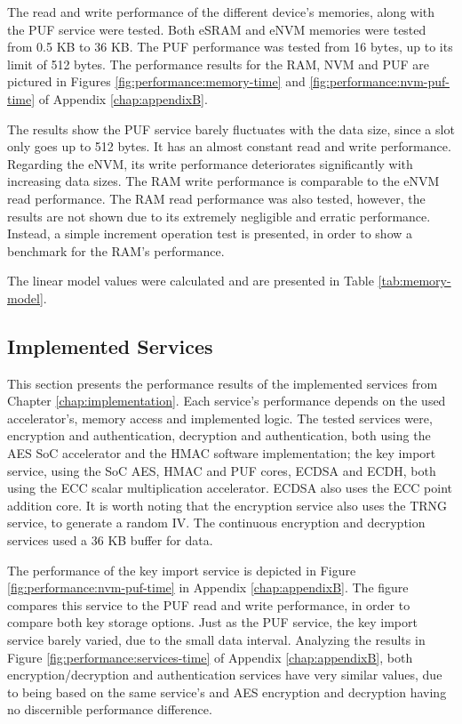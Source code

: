 The read and write performance of the different device's memories, along with the PUF service were tested. Both eSRAM and eNVM memories were tested from 0.5 KB to 36 KB. The PUF performance was tested from 16 bytes, up to its limit of 512 bytes.
The performance results for the RAM, NVM and PUF are pictured in Figures \ref{fig:performance:memory-time} and \ref{fig:performance:nvm-puf-time} of Appendix \ref{chap:appendixB}.

The results show the PUF service barely fluctuates with the data size, since a slot only goes up to 512 bytes. It has an almost constant read and write performance.
Regarding the eNVM, its write performance deteriorates significantly with increasing data sizes.
The RAM write performance is comparable to the eNVM read performance. The RAM read performance was also tested, however, the results are not shown due to its extremely negligible and erratic performance. Instead, a simple increment operation test is presented, in order to show a benchmark for the RAM's performance.

The linear model values were calculated and are presented in Table \ref{tab:memory-model}.



\subsection{Implemented Services}\label{chap:evaluation:services}

This section presents the performance results of the implemented services from Chapter \ref{chap:implementation}. Each service's performance depends on the used accelerator's, memory access and implemented logic.
The tested services were, encryption and authentication, decryption and authentication, both using the AES SoC accelerator and the HMAC software implementation; the key import service, using the SoC AES, HMAC and PUF cores, ECDSA and ECDH, both using the ECC scalar multiplication accelerator. ECDSA also uses the ECC point addition core. It is worth noting that the encryption service also uses the TRNG service, to generate a random IV. 
The continuous encryption and decryption services used a 36 KB buffer for data.

The performance of the key import service is depicted in Figure \ref{fig:performance:nvm-puf-time} in Appendix \ref{chap:appendixB}. The figure compares this service to the PUF read and write performance, in order to compare both key storage options.
Just as the PUF service, the key import service barely varied, due to the small data interval.
Analyzing the results in Figure	\ref{fig:performance:services-time} of Appendix	\ref{chap:appendixB}, both encryption/decryption and authentication services have very similar values, due to being based on the same service's and AES encryption and decryption having no discernible performance difference.

